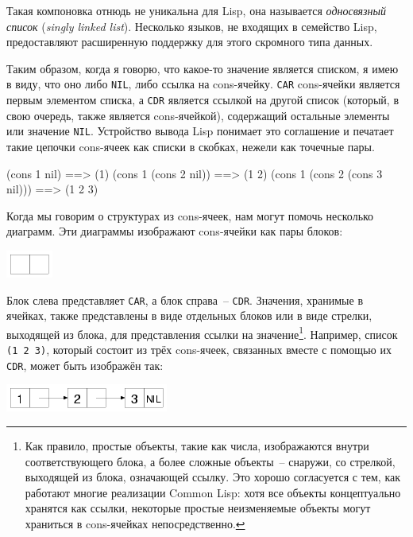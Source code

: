 Такая компоновка отнюдь не уникальна для Lisp, она называется \textit{односвязный
список} (\textit{singly linked list}). Несколько языков, не входящих в семейство Lisp,
предоставляют расширенную поддержку для этого скромного типа данных.

Таким образом, когда я говорю, что какое-то значение является списком, я имею в виду, что
оно либо \lstinline{NIL}, либо ссылка на cons-ячейку. \lstinline{CAR} cons-ячейки является первым
элементом списка, а \lstinline{CDR} является ссылкой на другой список (который, в свою очередь,
также является cons-ячейкой), содержащий остальные элементы или значение
\lstinline{NIL}. Устройство вывода Lisp понимает это соглашение и печатает такие цепочки
cons-ячеек как списки в скобках, нежели как точечные пары.

\begin{myverb}
(cons 1 nil)                   ==> (1)
(cons 1 (cons 2 nil))          ==> (1 2)
(cons 1 (cons 2 (cons 3 nil))) ==> (1 2 3)
\end{myverb}

Когда мы говорим о структурах из cons-ячеек, нам могут помочь несколько диаграмм. Эти
диаграммы изображают cons-ячейки как пары блоков:

\begin{center}
\includegraphics[scale=0.6]{images/one-cons-cell.png}
\end{center}

Блок слева представляет \lstinline{CAR}, а блок справа~-- \lstinline{CDR}. Значения, хранимые в
ячейках, также представлены в виде отдельных блоков или в виде стрелки, выходящей из блока,
для представления ссылки на значение\footnote{Как правило, простые объекты, такие как
  числа, изображаются внутри соответствующего блока, а более сложные объекты~-- снаружи, со
  стрелкой, выходящей из блока, означающей ссылку. Это хорошо согласуется с тем, как
  работают многие реализации Common Lisp: хотя все объекты концептуально хранятся как
  ссылки, некоторые простые неизменяемые объекты могут храниться в cons-ячейках
  непосредственно.}. Например, список \lstinline{(1 2 3)}, который состоит из трёх cons-ячеек,
связанных вместе с помощью их \lstinline{CDR}, может быть изображён так:

\begin{center}
  \includegraphics[scale=0.6]{images/list-1-2-3.png}
\end{center}

